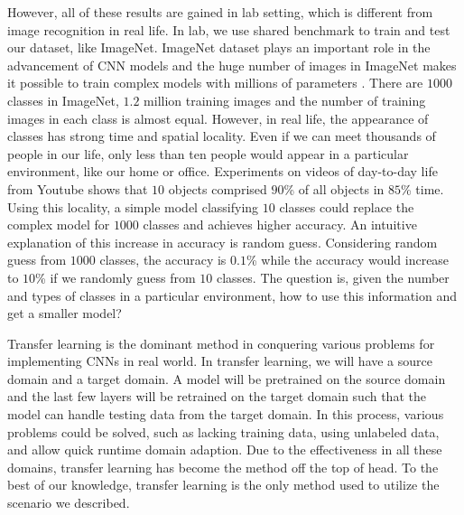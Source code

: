 \documentclass{article}
\begin{document}
However, all of these results are gained in lab setting, which is different from image recognition in real life. In lab, we use shared benchmark to train and test our dataset, like ImageNet. ImageNet dataset plays an important role in the advancement of CNN models and the huge number of images in ImageNet makes it possible to train complex models with millions of parameters \cite{simonyan2014very, szegedy2015going, huang2017densely}. There are $1000$ classes in ImageNet, $1.2$ million training images and the number of training images in each class is almost equal. However, in real life, the appearance of classes has strong time and spatial locality. Even if we can meet thousands of people in our life, only less than ten people would appear in a particular environment, like our home or office. Experiments on videos of day-to-day life from Youtube \cite{shen2017fast} shows that $10$ objects comprised $90$\% of all objects in $85$\% time. Using this locality, a simple model classifying $10$ classes could replace the complex model for $1000$ classes and achieves higher accuracy. An intuitive explanation of this increase in accuracy is random guess. Considering random guess from $1000$ classes, the accuracy is $0.1$\% while the accuracy would increase to $10$\% if we randomly guess from $10$ classes. The question is, given the number and types of classes in a particular environment, how to use this information and get a smaller model?

Transfer learning is the dominant method in conquering various problems for implementing CNNs in real world. In transfer learning, we will have a source domain and a target domain. A model will be pretrained on the source domain and the last few layers will be retrained on the target domain such that the model can handle testing data from the target domain. In this process, various problems could be solved, such as lacking training data, using unlabeled data, and allow quick runtime domain adaption. Due to the effectiveness in all these domains, transfer learning has become the method off the top of head. To the best of our knowledge, transfer learning is the only method used to utilize the scenario we described.
\end{document}
